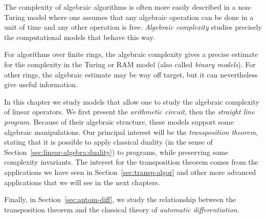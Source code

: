 The complexity of algebraic algorithms is often more easily described
in a non-Turing model where one assumes that any algebraic operation
can be done in a unit of time and any other operation is
free. \emph{Algebraic complexity} studies precisely the computational
models that behave this way.

  For algorithms over finite rings, the
algebraic complexity gives a precise estimate for the complexity in
the Turing or RAM model (also called \emph{binary models}). For other
rings, the algebraic estimate may be way off target, but it can
nevertheless give useful information.

In this chapter we study models that allow one to study the algebraic
complexity of linear operators. We first present the \emph{arithmetic
  circuit}, then the \emph{straight line program}. Because of their
algebraic structure, these models support some algebraic
manipulations.  Our principal interest will be the \emph{transposition
  theorem}, stating that it is possible to apply classical duality (in
the sense of Section~\ref{sec:linear-algebra:duality}) to programs,
while preserving some complexity invariants. The interest for the
transposition theorem comes from the applications we have seen in
Section~\ref{sec:transp-algor} and other more advanced applications
that we will see in the next chapters.

Finally, in Section~\ref{sec:autom-diff}, we study the
relationship between the transposition theorem and the classical
theory of \emph{automatic differentiation}.



%

